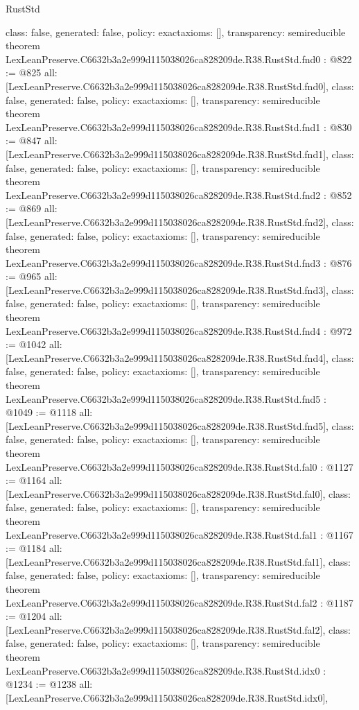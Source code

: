 \begin{lexlean}{RustStd}
\begin{coremodule}
{  class: false,
  generated: false,
  policy: exact{axioms: []},
  transparency: semireducible
}
theorem LexLeanPreserve.C6632b3a2e999d115038026ca828209de.R38.RustStd.fnd0 : @822 := @825 {
  all: [LexLeanPreserve.C6632b3a2e999d115038026ca828209de.R38.RustStd.fnd0],
  class: false,
  generated: false,
  policy: exact{axioms: []},
  transparency: semireducible
}
theorem LexLeanPreserve.C6632b3a2e999d115038026ca828209de.R38.RustStd.fnd1 : @830 := @847 {
  all: [LexLeanPreserve.C6632b3a2e999d115038026ca828209de.R38.RustStd.fnd1],
  class: false,
  generated: false,
  policy: exact{axioms: []},
  transparency: semireducible
}
theorem LexLeanPreserve.C6632b3a2e999d115038026ca828209de.R38.RustStd.fnd2 : @852 := @869 {
  all: [LexLeanPreserve.C6632b3a2e999d115038026ca828209de.R38.RustStd.fnd2],
  class: false,
  generated: false,
  policy: exact{axioms: []},
  transparency: semireducible
}
theorem LexLeanPreserve.C6632b3a2e999d115038026ca828209de.R38.RustStd.fnd3 : @876 := @965 {
  all: [LexLeanPreserve.C6632b3a2e999d115038026ca828209de.R38.RustStd.fnd3],
  class: false,
  generated: false,
  policy: exact{axioms: []},
  transparency: semireducible
}
theorem LexLeanPreserve.C6632b3a2e999d115038026ca828209de.R38.RustStd.fnd4 : @972 := @1042 {
  all: [LexLeanPreserve.C6632b3a2e999d115038026ca828209de.R38.RustStd.fnd4],
  class: false,
  generated: false,
  policy: exact{axioms: []},
  transparency: semireducible
}
theorem LexLeanPreserve.C6632b3a2e999d115038026ca828209de.R38.RustStd.fnd5 : @1049 := @1118 {
  all: [LexLeanPreserve.C6632b3a2e999d115038026ca828209de.R38.RustStd.fnd5],
  class: false,
  generated: false,
  policy: exact{axioms: []},
  transparency: semireducible
}
theorem LexLeanPreserve.C6632b3a2e999d115038026ca828209de.R38.RustStd.fal0 : @1127 := @1164 {
  all: [LexLeanPreserve.C6632b3a2e999d115038026ca828209de.R38.RustStd.fal0],
  class: false,
  generated: false,
  policy: exact{axioms: []},
  transparency: semireducible
}
theorem LexLeanPreserve.C6632b3a2e999d115038026ca828209de.R38.RustStd.fal1 : @1167 := @1184 {
  all: [LexLeanPreserve.C6632b3a2e999d115038026ca828209de.R38.RustStd.fal1],
  class: false,
  generated: false,
  policy: exact{axioms: []},
  transparency: semireducible
}
theorem LexLeanPreserve.C6632b3a2e999d115038026ca828209de.R38.RustStd.fal2 : @1187 := @1204 {
  all: [LexLeanPreserve.C6632b3a2e999d115038026ca828209de.R38.RustStd.fal2],
  class: false,
  generated: false,
  policy: exact{axioms: []},
  transparency: semireducible
}
theorem LexLeanPreserve.C6632b3a2e999d115038026ca828209de.R38.RustStd.idx0 : @1234 := @1238 {
  all: [LexLeanPreserve.C6632b3a2e999d115038026ca828209de.R38.RustStd.idx0],
}
\end{coremodule}
\end{lexlean}
